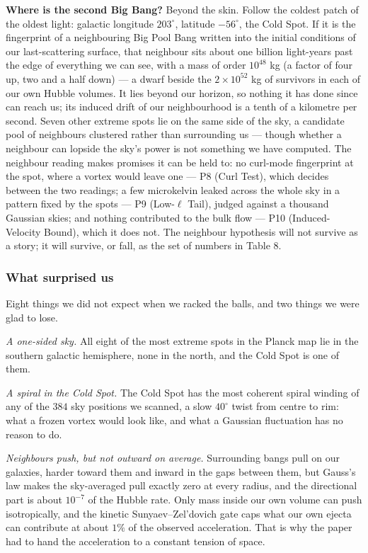 \documentclass[
  11pt,
]{article}
\begin{document}
\textbf{Where is the second Big Bang?} Beyond the skin. Follow the
coldest patch of the oldest light: galactic longitude \(203^\circ\),
latitude \(-56^\circ\), the Cold Spot. If it is the fingerprint of a
neighbouring Big Pool Bang written into the initial conditions of our
last-scattering surface, that neighbour sits about one billion
light-years past the edge of everything we can see, with a mass of order
\(10^{48}\) kg (a factor of four up, two and a half down) --- a dwarf
beside the \(2\times10^{52}\) kg of survivors in each of our own Hubble
volumes. It lies beyond our horizon, so nothing it has done since can
reach us; its induced drift of our neighbourhood is a tenth of a
kilometre per second. Seven other extreme spots lie on the same side of
the sky, a candidate pool of neighbours clustered rather than
surrounding us --- though whether a neighbour can lopside the sky's
power is not something we have computed. The neighbour reading makes
promises it can be held to: no curl-mode fingerprint at the spot, where
a vortex would leave one --- P8 (Curl Test), which decides between the
two readings; a few microkelvin leaked across the whole sky in a pattern
fixed by the spots --- P9 (Low-\(\ell\) Tail), judged against a thousand
Gaussian skies; and nothing contributed to the bulk flow --- P10
(Induced-Velocity Bound), which it does not. The neighbour hypothesis
will not survive as a story; it will survive, or fall, as the set of
numbers in Table 8.

\hypertarget{what-surprised-us}{%
\subsubsection{What surprised us}\label{what-surprised-us}}

Eight things we did not expect when we racked the balls, and two things
we were glad to lose.

\emph{A one-sided sky.} All eight of the most extreme spots in the
Planck map lie in the southern galactic hemisphere, none in the north,
and the Cold Spot is one of them.

\emph{A spiral in the Cold Spot.} The Cold Spot has the most coherent
spiral winding of any of the \(384\) sky positions we scanned, a slow
\(40^\circ\) twist from centre to rim: what a frozen vortex would look
like, and what a Gaussian fluctuation has no reason to do.

\emph{Neighbours push, but not outward on average.} Surrounding bangs
pull on our galaxies, harder toward them and inward in the gaps between
them, but Gauss's law makes the sky-averaged pull exactly zero at every
radius, and the directional part is about \(10^{-7}\) of the Hubble
rate. Only mass inside our own volume can push isotropically, and the
kinetic Sunyaev--Zel'dovich gate caps what our own ejecta can contribute
at about \(1\%\) of the observed acceleration. That is why the paper had
to hand the acceleration to a constant tension of space.
\end{document}
